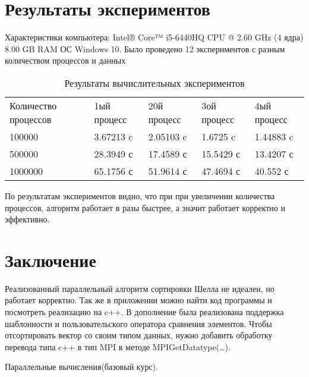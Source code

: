 \documentclass{report}
\begin{document}
\newpage
\section*{Результаты экспериментов}
Характеристики компьютера:
Intel® Core™ i5-6440HQ CPU @ 2.60 GHz (4 ядра)
8.00 GB RAM
ОС Windows 10.
Было проведено 12 экспериментов с разным количеством процессов и данных


\begin{table}[!h]
\caption{Результаты вычислительных экспериментов}
\centering
\begin{tabular}{lllll}
Количество процессов & 1ый процесс & 20й процесс & 3ой процесс & 4ый процесс\\
100000 & 3.67213 c & 2.05103 c & 1.6725 c & 1.44883 c\\
500000 & 28.3949 с & 17.4589 с & 15.5429 с & 13.4207 с\\
1000000 & 65.1756 с & 51.9614 с & 47.4694 с & 40.552 с\\
\end{tabular}
\end{table}
\par
По результатам экспериментов видно, что при при увеличении количества процессов, алгоритм работает в разы быстрее, а значит работает корректно и эффективно.
\newpage

\section*{Заключение}
Реализованный параллельный алгоритм сортировки Шелла не идеален, но  работает корректно. Так же в приложении можно найти код программы и посмотреть реализацию на c++. В дополнение была реализована поддержка шаблонности и пользовательского оператора сравнения элементов. Чтобы отсортировать вектор со своим типом данных, нужно добавить обработку перевода типа c++ в тип MPI в методе MPIGetDatatype(…).
\newpage

\begin{thebibliography}{1}
Параллельные вычисления(базовый курс).

\end{thebibliography}
\newpage

\end{document}
